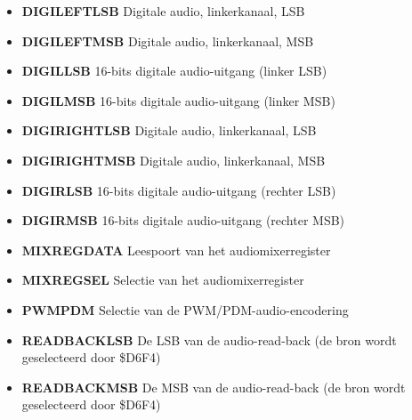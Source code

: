 \begin{itemize}
\item{\bf{DIGILEFTLSB}} Digitale audio, linkerkanaal, LSB
\item{\bf{DIGILEFTMSB}} Digitale audio, linkerkanaal, MSB
\item{\bf{DIGILLSB}} 16-bits digitale audio-uitgang (linker LSB)
\item{\bf{DIGILMSB}} 16-bits digitale audio-uitgang (linker MSB)
\item{\bf{DIGIRIGHTLSB}} Digitale audio, linkerkanaal, LSB
\item{\bf{DIGIRIGHTMSB}} Digitale audio, linkerkanaal, MSB
\item{\bf{DIGIRLSB}} 16-bits digitale audio-uitgang (rechter LSB)
\item{\bf{DIGIRMSB}} 16-bits digitale audio-uitgang (rechter MSB)
\item{\bf{MIXREGDATA}} Leespoort van het audiomixerregister
\item{\bf{MIXREGSEL}} Selectie van het audiomixerregister
\item{\bf{PWMPDM}} Selectie van de PWM/PDM-audio-encodering
\item{\bf{READBACKLSB}} De LSB van de audio-read-back (de bron wordt geselecteerd door \$D6F4)
\item{\bf{READBACKMSB}} De MSB van de audio-read-back (de bron wordt geselecteerd door \$D6F4)
\end{itemize}
